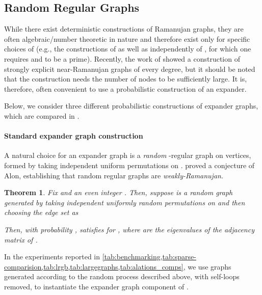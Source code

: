 \documentclass{article}
\theoremstyle{plain}
\newtheorem{theorem}{Theorem}[section]
\theoremstyle{definition}
\theoremstyle{remark}
\begin{document}
\subsection{Random Regular Graphs}
While there exist deterministic constructions of Ramanujan graphs, they are often algebraic/number theoretic in nature and therefore exist only for specific choices of  (e.g., the constructions of \citet{LubotzkyPS88} as well as independently of \citet{Margulis88}, for which one requires  and  to be a prime). Recently, the work of \citet{Alon21} showed a construction of strongly explicit near-Ramanujan graphs of every degree, but it should be noted that the construction needs the number of nodes to be sufficiently large. It is, therefore, often convenient to use a probabilistic construction of an expander.

Below, we consider three different probabilistic constructions of expander graphs, which are compared in .

\paragraph{Standard expander graph construction}
A natural choice for an expander graph is a \emph{random} -regular graph on  vertices, formed by taking  independent uniform permutations on . \citet{Friedman03} proved a conjecture of Alon, establishing that random regular graphs are \emph{weakly-Ramanujan}.
\begin{theorem}\citep[Theorem 1.1]{Friedman03}
\label{thm:randomregular}
 Fix  and an even integer . Then, suppose  is a random graph generated by taking  independent uniformly random permutations  on  and then choosing the edge set as
 
 Then, with probability ,
  satisfies
  for , where  are the eigenvalues of the adjacency matrix of . 
\end{theorem}

In the experiments reported in \cref{tab:benchmarking,tab:sparse-comparision,tab:lrgb,tab:largegraphs,tab:alations_comps}, we use graphs generated according to the random process described above, with self-loops removed, to instantiate the expander graph component of .
\end{document}
